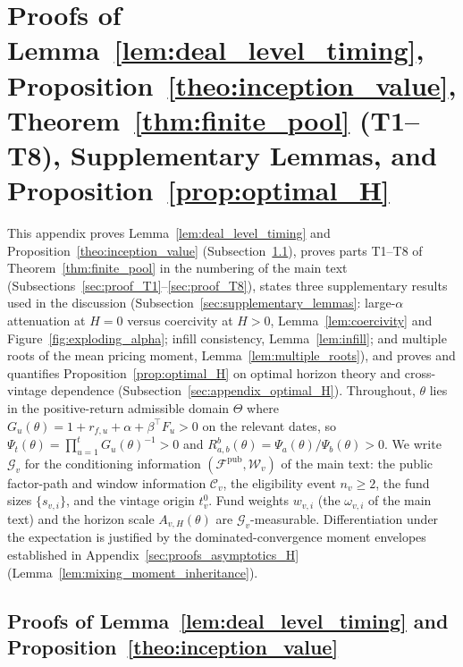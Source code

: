 \section{Proofs of Lemma~\ref{lem:deal_level_timing}, Proposition~\ref{theo:inception_value}, Theorem~\ref{thm:finite_pool} (T1--T8), Supplementary Lemmas, and Proposition~\ref{prop:optimal_H}}
\label{sec:appendix_theory}

This appendix proves Lemma~\ref{lem:deal_level_timing} and Proposition~\ref{theo:inception_value} (Subsection~\ref{sec:proof_timing}), proves parts T1--T8 of Theorem~\ref{thm:finite_pool} in the numbering of the main text (Subsections~\ref{sec:proof_T1}--\ref{sec:proof_T8}), states three supplementary results used in the discussion (Subsection~\ref{sec:supplementary_lemmas}: large-$\alpha$ attenuation at $H=0$ versus coercivity at $H>0$, Lemma~\ref{lem:coercivity} and Figure~\ref{fig:exploding_alpha}; infill consistency, Lemma~\ref{lem:infill}; and multiple roots of the mean pricing moment, Lemma~\ref{lem:multiple_roots}), and proves and quantifies Proposition~\ref{prop:optimal_H} on optimal horizon theory and cross-vintage dependence (Subsection~\ref{sec:appendix_optimal_H}). Throughout, $\theta$ lies in the positive-return admissible domain $\Theta$ where $G_u(\theta) = 1 + r_{f,u} + \alpha + \beta^\top F_u > 0$ on the relevant dates, so $\Psi_t(\theta) = \prod_{u=1}^t G_u(\theta)^{-1} > 0$ and $R^b_{a,b}(\theta) = \Psi_a(\theta)/\Psi_b(\theta) > 0$. We write $\mathcal{G}_v$ for the conditioning information $(\mathcal{F}^{\mathrm{pub}},\mathcal{W}_v)$ of the main text: the public factor-path and window information $\mathcal{C}_v$, the eligibility event $n_v \ge 2$, the fund sizes $\{s_{v,i}\}$, and the vintage origin $t_v^0$. Fund weights $w_{v,i}$ (the $\omega_{v,i}$ of the main text) and the horizon scale $A_{v,H}(\theta)$ are $\mathcal{G}_v$-measurable. Differentiation under the expectation is justified by the dominated-convergence moment envelopes established in Appendix~\ref{sec:proofs_asymptotics_H} (Lemma~\ref{lem:mixing_moment_inheritance}).

\subsection{Proofs of Lemma~\ref{lem:deal_level_timing} and Proposition~\ref{theo:inception_value}}
\label{sec:proof_timing}

